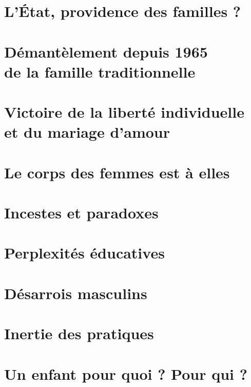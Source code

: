 \documentclass[12pt,french]{book}
\begin{document}
\chapter{L'État, providence des familles ?}


\chapter[Démantèlement depuis 1965 de la famille traditionnelle]{Démantèlement depuis 1965\\de la famille traditionnelle}


\chapter[Victoire de la liberté individuelle et du mariage d'amour]{Victoire de la liberté individuelle\\et du mariage d'amour}


\chapter{Le corps des femmes est à elles}


\chapter{Incestes et paradoxes}


\chapter{Perplexités éducatives}


\chapter{Désarrois masculins}


\chapter{Inertie des pratiques}


\chapter{Un enfant pour quoi ? Pour qui ?}

\end{document}

